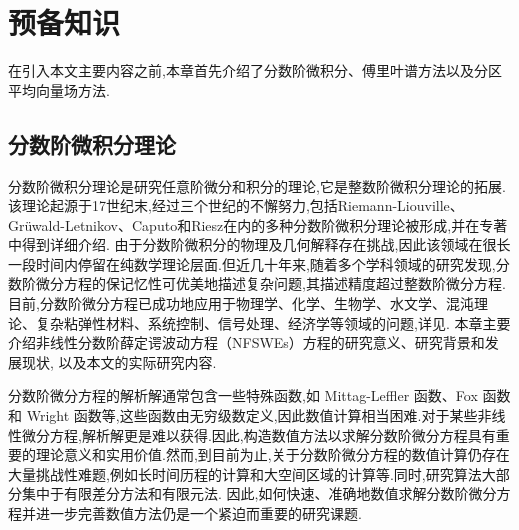 \chapter[预备知识]{预备知识}

在引入本文主要内容之前,本章首先介绍了分数阶微积分、傅里叶谱方法以及分区平均向量场方法.
\section{分数阶微积分理论}
分数阶微积分理论是研究任意阶微分和积分的理论,它是整数阶微积分理论的拓展.该理论起源于17世纪末,经过三个世纪的不懈努力,包括Riemann-Liouville、Grüwald-Letnikov、Caputo和Riesz在内的多种分数阶微积分理论被形成,并在专著\cite{samkoFractionalIntegralsDerivatives1993}中得到详细介绍.
由于分数阶微积分的物理及几何解释存在挑战,因此该领域在很长一段时间内停留在纯数学理论层面.但近几十年来,随着多个学科领域的研究发现,分数阶微分方程的保记忆性可优美地描述复杂问题,其描述精度超过整数阶微分方程.目前,分数阶微分方程已成功地应用于物理学、化学、生物学、水文学、混沌理论、复杂粘弹性材料、系统控制、信号处理、经济学等领域的问题,详见\cite{liIntroductionFractionalCalculus2015,HandbookDifferentialEquations2008,brychkovIndefiniteIntegrals2008,zhangMassBalanceBased2005,carrerasAnomalousDiffusionExit2001,hilferFRACTIONALCALCULUSREGULAR2000,liangRobustnessFractionalorderBoundary2007,maginSolvingFractionalOrder2009,zaslavskySelfsimilarTransportIncomplete1993,sunRandomorderFractionalDifferential2011}.
本章主要介绍非线性分数阶薛定谔波动方程（NFSWEs）方程的研究意义、研究背景和发展现状, 以及本文的实际研究内容.

分数阶微分方程的解析解通常包含一些特殊函数,如 Mittag-Leffler 函数、Fox 函数和 Wright 函数等,这些函数由无穷级数定义,因此数值计算相当困难.对于某些非线性微分方程,解析解更是难以获得.因此,构造数值方法以求解分数阶微分方程具有重要的理论意义和实用价值.然而,到目前为止,关于分数阶微分方程的数值计算仍存在大量挑战性难题,例如长时间历程的计算和大空间区域的计算等.同时,研究算法大部分集中于有限差分方法和有限元法.
因此,如何快速、准确地数值求解分数阶微分方程并进一步完善数值方法仍是一个紧迫而重要的研究课题.

